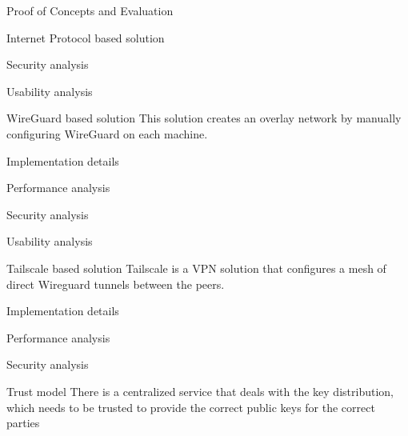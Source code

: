\begin{frame}{Proof of Concepts and Evaluation}
\begin{block}{Internet Protocol based solution}
\begin{block}{Security analysis}
\protect\hypertarget{security-analysis}{}
\end{block}

\begin{block}{Usability analysis}
\protect\hypertarget{usability-analysis}{}
\end{block}
\end{block}

\begin{block}{WireGuard based solution}
\protect\hypertarget{wireguard-based-solution}{}
This solution creates an overlay network by manually configuring
WireGuard on each machine.

\begin{block}{Implementation details}
\protect\hypertarget{implementation-details}{}
\end{block}

\begin{block}{Performance analysis}
\protect\hypertarget{performance-analysis}{}
\end{block}

\begin{block}{Security analysis}
\protect\hypertarget{security-analysis}{}
\end{block}

\begin{block}{Usability analysis}
\protect\hypertarget{usability-analysis}{}
\end{block}
\end{block}

\begin{block}{Tailscale based solution}
\protect\hypertarget{tailscale-based-solution}{}
Tailscale is a VPN solution that configures a mesh of direct Wireguard
tunnels between the peers.

\begin{block}{Implementation details}
\protect\hypertarget{implementation-details}{}
\end{block}

\begin{block}{Performance analysis}
\protect\hypertarget{performance-analysis}{}
\end{block}

\begin{block}{Security analysis}
\protect\hypertarget{security-analysis}{}
\begin{block}{Trust model}
\protect\hypertarget{trust-model}{}
There is a centralized service that deals with the key distribution,
which needs to be trusted to provide the correct public keys for the
correct parties
\end{block}


\end{block}
\end{block}
\end{frame}
